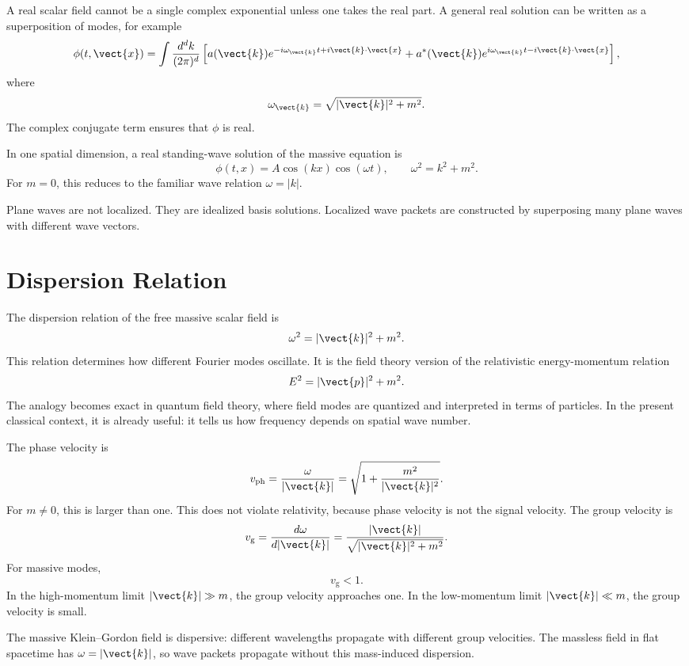 A real scalar field cannot be a single complex exponential unless one takes the
real part. A general real solution can be written as a superposition of modes,
for example
\[
    \phi(t,\vect{x})
    =\int \frac{d^d k}{(2\pi)^d}\left[
        a(\vect{k})e^{-i\omega_{\vect{k}}t+i\vect{k}\cdot\vect{x}}
        +a^*(\vect{k})e^{i\omega_{\vect{k}}t-i\vect{k}\cdot\vect{x}}
    \right],
\]
where
\[
    \omega_{\vect{k}}=\sqrt{|\vect{k}|^2+m^2}.
\]
The complex conjugate term ensures that \(\phi\) is real.

\begin{examplebox}
In one spatial dimension, a real standing-wave solution of the massive equation
is
\[
    \phi(t,x)=A\cos(kx)\cos(\omega t),
    \qquad
    \omega^2=k^2+m^2.
\]
For \(m=0\), this reduces to the familiar wave relation \(\omega=|k|\).
\end{examplebox}

Plane waves are not localized. They are idealized basis solutions. Localized
wave packets are constructed by superposing many plane waves with different
wave vectors.

\section{Dispersion Relation}

The dispersion relation of the free massive scalar field is
\[
    \omega^2=|\vect{k}|^2+m^2.
\]
This relation determines how different Fourier modes oscillate. It is the field
theory version of the relativistic energy-momentum relation
\[
    E^2=|\vect{p}|^2+m^2.
\]
The analogy becomes exact in quantum field theory, where field modes are
quantized and interpreted in terms of particles. In the present classical
context, it is already useful: it tells us how frequency depends on spatial
wave number.

The phase velocity is
\[
    v_{\mathrm{ph}}=\frac{\omega}{|\vect{k}|}
    =\sqrt{1+\frac{m^2}{|\vect{k}|^2}}.
\]
For \(m\neq0\), this is larger than one. This does not violate relativity,
because phase velocity is not the signal velocity. The group velocity is
\[
    v_{\mathrm{g}}=\frac{d\omega}{d|\vect{k}|}
    =\frac{|\vect{k}|}{\sqrt{|\vect{k}|^2+m^2}}.
\]
For massive modes,
\[
    v_{\mathrm{g}}<1.
\]
In the high-momentum limit \(|\vect{k}|\gg m\), the group velocity approaches
one. In the low-momentum limit \(|\vect{k}|\ll m\), the group velocity is small.

\begin{remarkbox}
The massive Klein--Gordon field is dispersive: different wavelengths propagate
with different group velocities. The massless field in flat spacetime has
\(\omega=|\vect{k}|\), so wave packets propagate without this mass-induced
dispersion.
\end{remarkbox}

